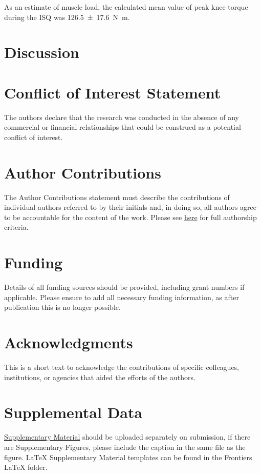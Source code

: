 \documentclass[utf8]{style/FrontiersinHarvard}
\begin{document}
As an estimate of muscle load, the calculated mean value of peak knee torque during the ISQ was \SI{126.5 \pm 17.6}{\newton \meter}.

\section{Discussion}

\section*{Conflict of Interest Statement}
The authors declare that the research was conducted in the absence of any commercial or financial relationships that could be construed as a potential conflict of interest.

\section*{Author Contributions}
The Author Contributions statement must describe the contributions of individual authors referred to by their initials and, in doing so, all authors agree to be accountable for the content of the work.
Please see \href{https://www.frontiersin.org/about/policies-and-publication-ethics#AuthorshipAuthorResponsibilities}{here} for full authorship criteria.

\section*{Funding}
Details of all funding sources should be provided, including grant numbers if applicable.
Please ensure to add all necessary funding information, as after publication this is no longer possible.

\section*{Acknowledgments}
This is a short text to acknowledge the contributions of specific colleagues, institutions, or agencies that aided the efforts of the authors.

\section*{Supplemental Data}
 \href{http://home.frontiersin.org/about/author-guidelines#SupplementaryMaterial}{Supplementary Material} should be uploaded separately on submission, if there are Supplementary Figures, please include the caption in the same file as the figure. LaTeX Supplementary Material templates can be found in the Frontiers LaTeX folder.



\end{document}
